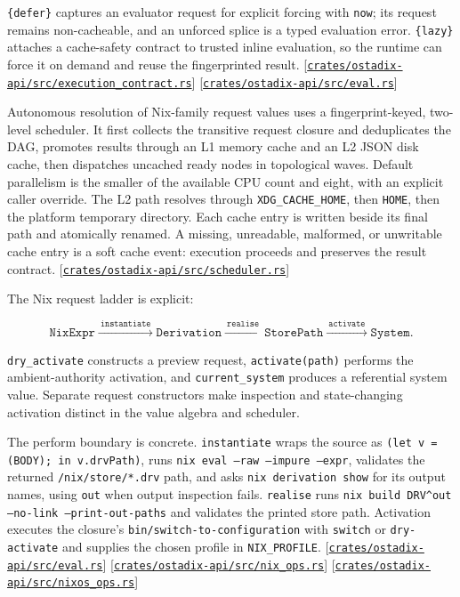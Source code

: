 \documentclass[11pt,oneside]{article}
\newcommand{\src}[1]{\textcolor{OSlate}{\scriptsize[\href{https://github.com/lostadi/OSTADIX/blob/c0b02c326b2329a95ba52447c7180bc93957cd57/#1}{\nolinkurl{#1}}]}\allowbreak}
\begin{document}
\texttt{\{defer\}} captures an evaluator request for explicit forcing with
\texttt{now}; its request remains non-cacheable, and an unforced splice is a
typed evaluation error. \texttt{\{lazy\}} attaches a cache-safety contract to
trusted inline evaluation, so the runtime can force it on demand and reuse the
fingerprinted result.
\src{crates/ostadix-api/src/execution_contract.rs}
\src{crates/ostadix-api/src/eval.rs}

Autonomous resolution of Nix-family request values uses a fingerprint-keyed,
two-level scheduler. It first
collects the transitive request closure and deduplicates the DAG, promotes
results through an L1 memory cache and an L2 JSON disk cache, then dispatches
uncached ready nodes in topological waves. Default parallelism is the smaller
of the available CPU count and eight, with an explicit caller override. The L2
path resolves through \texttt{XDG\_CACHE\_HOME}, then \texttt{HOME}, then the
platform temporary directory. Each cache entry is written beside its final
path and atomically renamed. A missing, unreadable, malformed, or unwritable
cache entry is a soft cache event: execution proceeds and preserves the result
contract. \src{crates/ostadix-api/src/scheduler.rs}

The Nix request ladder is explicit:

\[
\texttt{NixExpr}
\xrightarrow{\ \texttt{instantiate}\ }
\texttt{Derivation}
\xrightarrow{\ \texttt{realise}\ }
\texttt{StorePath}
\xrightarrow{\ \texttt{activate}\ }
\texttt{System}.
\]

\texttt{dry\_activate} constructs a preview request,
\texttt{activate(path)} performs the ambient-authority activation, and
\texttt{current\_system} produces a referential system value. Separate request
constructors make inspection and state-changing activation distinct in the
value algebra and scheduler.

The perform boundary is concrete. \texttt{instantiate} wraps the source as
\texttt{(let v = (BODY); in v.drvPath)}, runs
\texttt{nix eval --raw --impure --expr}, validates the returned
\texttt{/nix/store/*.drv} path, and asks \texttt{nix derivation show} for its
output names, using \texttt{out} when output inspection fails. \texttt{realise}
runs \texttt{nix build DRV\string^out --no-link --print-out-paths} and validates the
printed store path. Activation executes the closure's
\texttt{bin/switch-to-configuration} with \texttt{switch} or
\texttt{dry-activate} and supplies the chosen profile in \texttt{NIX\_PROFILE}.
\src{crates/ostadix-api/src/eval.rs}
\src{crates/ostadix-api/src/nix_ops.rs}
\src{crates/ostadix-api/src/nixos_ops.rs}
\end{document}
